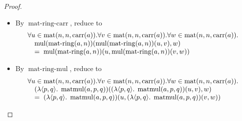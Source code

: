 \documentclass[11pt]{article}
\theoremstyle{plain}
\begin{document}
\begin{proof}
\begin{itemize}[leftmargin=2.8em, itemsep=4pt, parsep=1pt]
  \item[\textbf{89}] By $\operatorname{mat\text{-}ring\text{-}carr}$, reduce to
\begin{equation*}
\begin{array}{@{}l@{}} \forall u \in \operatorname{mat}(n, n, \operatorname{carr}(a)). \forall v \in \operatorname{mat}(n, n, \operatorname{carr}(a)). \forall w \in \operatorname{mat}(n, n, \operatorname{carr}(a)). \\ \quad \operatorname{mul}(\operatorname{mat\text{-}ring}(a, n))(\operatorname{mul}(\operatorname{mat\text{-}ring}(a, n))(u, v), w) \\ \quad =\; \operatorname{mul}(\operatorname{mat\text{-}ring}(a, n))(u, \operatorname{mul}(\operatorname{mat\text{-}ring}(a, n))(v, w)) \end{array}
\end{equation*}

  \item[\textbf{90}] By $\operatorname{mat\text{-}ring\text{-}mul}$, reduce to
\begin{equation*}
\begin{array}{@{}l@{}} \forall u \in \operatorname{mat}(n, n, \operatorname{carr}(a)). \forall v \in \operatorname{mat}(n, n, \operatorname{carr}(a)). \forall w \in \operatorname{mat}(n, n, \operatorname{carr}(a)). \\ \quad (\lambda \langle p, q \rangle.\; \operatorname{matmul}(a, p, q))((\lambda \langle p, q \rangle.\; \operatorname{matmul}(a, p, q))(u, v), w) \\ \quad =\; (\lambda \langle p, q \rangle.\; \operatorname{matmul}(a, p, q))(u, (\lambda \langle p, q \rangle.\; \operatorname{matmul}(a, p, q))(v, w)) \end{array}
\end{equation*}


\end{itemize}
\end{proof}
\end{document}
